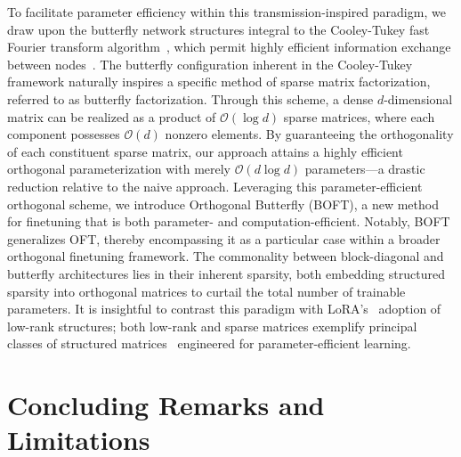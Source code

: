 To facilitate parameter efficiency within this transmission-inspired paradigm, we draw upon the butterfly network structures integral to the Cooley-Tukey fast Fourier transform algorithm~\cite{cooley1965algorithm}, which permit highly efficient information exchange between nodes~\cite{klasing1994broadcasting}. The butterfly configuration inherent in the Cooley-Tukey framework naturally inspires a specific method of sparse matrix factorization, referred to as butterfly factorization. Through this scheme, a dense $d$-dimensional matrix can be realized as a product of $\mathcal{O}(\log d)$ sparse matrices, where each component possesses $\mathcal{O}(d)$ nonzero elements. By guaranteeing the orthogonality of each constituent sparse matrix, our approach attains a highly efficient orthogonal parameterization with merely $\mathcal{O}(d\log d)$ parameters—a drastic reduction relative to the naive approach. Leveraging this parameter-efficient orthogonal scheme, we introduce Orthogonal Butterfly (BOFT), a new method for finetuning that is both parameter- and computation-efficient. Notably, BOFT generalizes OFT, thereby encompassing it as a particular case within a broader orthogonal finetuning framework. The commonality between block-diagonal and butterfly architectures lies in their inherent sparsity, both embedding structured sparsity into orthogonal matrices to curtail the total number of trainable parameters. It is insightful to contrast this paradigm with LoRA’s~\cite{hulora2022} adoption of low-rank structures; both low-rank and sparse matrices exemplify principal classes of structured matrices~\cite{candes2011robust} engineered for parameter-efficient learning.

\section{Concluding Remarks and Limitations}

